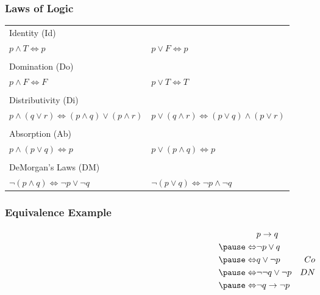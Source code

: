 \documentclass[dvipsnames]{beamer}
\begin{document}
\begin{frame}
  \frametitle{Laws of Logic}

  \begin{tabular}{ll}
  \alert{Identity (Id)} &\\
    $p \wedge T \Leftrightarrow p$ &
    $p \vee F \Leftrightarrow p$\\\\
  \pause
  \alert{Domination (Do)} &\\
    $p \wedge F \Leftrightarrow F$ &
    $p \vee T \Leftrightarrow T$\\\\
  \pause
  \alert{Distributivity (Di)} &\\
    $p \wedge (q \vee r) \Leftrightarrow (p \wedge q) \vee (p \wedge r)$ &
    $p \vee (q \wedge r) \Leftrightarrow (p \vee q) \wedge (p \vee r)$\\\\
  \pause
  \alert{Absorption (Ab)} &\\
    $p \wedge (p \vee q) \Leftrightarrow p$ &
    $p \vee (p \wedge q) \Leftrightarrow p$\\\\
  \pause
  \alert{DeMorgan's Laws (DM)} &\\
    $\neg (p \wedge q) \Leftrightarrow \neg p \vee \neg q$ &
    $\neg (p \vee q) \Leftrightarrow \neg p \wedge \neg q$
  \end{tabular}
\end{frame}

\begin{frame}
  \frametitle{Equivalence Example}

  \begin{example}
    \begin{eqnarray*}
                      & p \rightarrow q           &   \\
      \pause
      \Leftrightarrow & \neg p \vee q             &   \\
      \pause
      \Leftrightarrow & q \vee \neg p             & Co\\
      \pause
      \Leftrightarrow & \neg \neg q \vee \neg p   & DN\\
      \pause
      \Leftrightarrow & \neg q \rightarrow \neg p &
    \end{eqnarray*}
  \end{example}
\end{frame}
\end{document}
